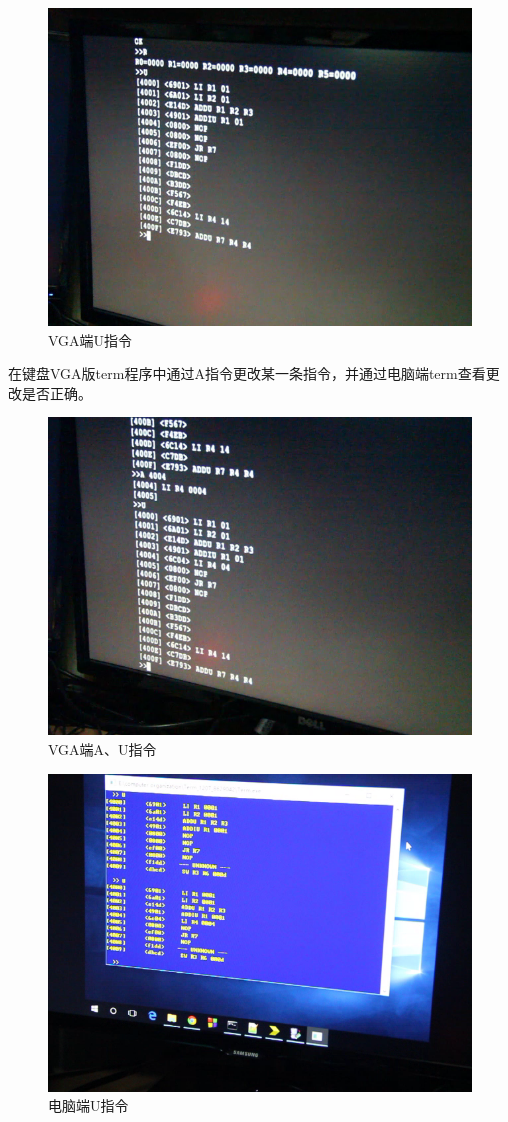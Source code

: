 \begin{figure}[H]
  \centering
  \includegraphics[width=4.5in]{Figures/picture/vlcsnap-2015-12-10-00h18m07s281.png}
  \caption{VGA端U指令}
\end{figure}

在键盘VGA版term程序中通过A指令更改某一条指令，并通过电脑端term查看更改是否正确。

\begin{figure}[H]
  \centering
  \includegraphics[width=4.5in]{Figures/picture/vlcsnap-2015-12-10-00h18m33s048.png}
  \caption{VGA端A、U指令}
\end{figure}

\begin{figure}[H]
  \centering
  \includegraphics[width=4.5in]{Figures/picture/vlcsnap-2015-12-10-00h18m41s120.png}
  \caption{电脑端U指令}
\end{figure}

